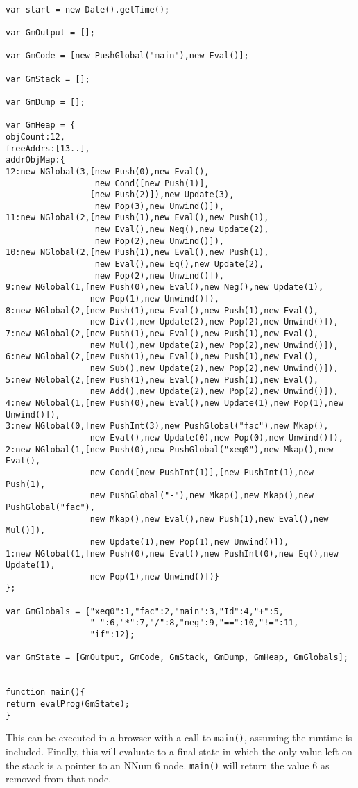 \begin{verbatim}

var start = new Date().getTime();

var GmOutput = [];

var GmCode = [new PushGlobal("main"),new Eval()];

var GmStack = [];

var GmDump = [];

var GmHeap = {
objCount:12,
freeAddrs:[13..],
addrObjMap:{
12:new NGlobal(3,[new Push(0),new Eval(),
			      new Cond([new Push(1)],
			     [new Push(2)]),new Update(3),
			      new Pop(3),new Unwind()]),
11:new NGlobal(2,[new Push(1),new Eval(),new Push(1),
				  new Eval(),new Neq(),new Update(2),
				  new Pop(2),new Unwind()]),
10:new NGlobal(2,[new Push(1),new Eval(),new Push(1),
				  new Eval(),new Eq(),new Update(2),
				  new Pop(2),new Unwind()]),
9:new NGlobal(1,[new Push(0),new Eval(),new Neg(),new Update(1),
				 new Pop(1),new Unwind()]),
8:new NGlobal(2,[new Push(1),new Eval(),new Push(1),new Eval(),
	  			 new Div(),new Update(2),new Pop(2),new Unwind()]),
7:new NGlobal(2,[new Push(1),new Eval(),new Push(1),new Eval(),
				 new Mul(),new Update(2),new Pop(2),new Unwind()]),
6:new NGlobal(2,[new Push(1),new Eval(),new Push(1),new Eval(),
				 new Sub(),new Update(2),new Pop(2),new Unwind()]),
5:new NGlobal(2,[new Push(1),new Eval(),new Push(1),new Eval(),
			     new Add(),new Update(2),new Pop(2),new Unwind()]),
4:new NGlobal(1,[new Push(0),new Eval(),new Update(1),new Pop(1),new Unwind()]),
3:new NGlobal(0,[new PushInt(3),new PushGlobal("fac"),new Mkap(),
				 new Eval(),new Update(0),new Pop(0),new Unwind()]),
2:new NGlobal(1,[new Push(0),new PushGlobal("xeq0"),new Mkap(),new Eval(),
				 new Cond([new PushInt(1)],[new PushInt(1),new Push(1),
				 new PushGlobal("-"),new Mkap(),new Mkap(),new PushGlobal("fac"),
				 new Mkap(),new Eval(),new Push(1),new Eval(),new Mul()]),
				 new Update(1),new Pop(1),new Unwind()]),
1:new NGlobal(1,[new Push(0),new Eval(),new PushInt(0),new Eq(),new Update(1),
				 new Pop(1),new Unwind()])}
};

var GmGlobals = {"xeq0":1,"fac":2,"main":3,"Id":4,"+":5,
				 "-":6,"*":7,"/":8,"neg":9,"==":10,"!=":11,
				 "if":12};

var GmState = [GmOutput, GmCode, GmStack, GmDump, GmHeap, GmGlobals]; 	


function main(){
return evalProg(GmState);
}

\end{verbatim}

\noindent This can be executed in a browser with a call to \verb!main()!, assuming
the runtime is included. Finally, this will evaluate to a final state in which
the only value left on the stack is a pointer to an NNum 6 node. \verb!main()! will
return the value 6 as removed from that node.
